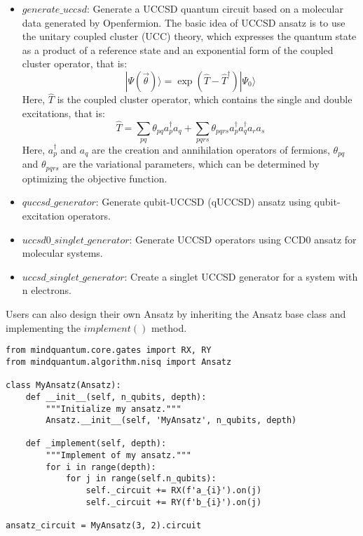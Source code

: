 \begin{itemize}
    \item $generate\_uccsd$: Generate a UCCSD quantum circuit based on a molecular data generated by Openfermion\cite{Peruzzo2014}. The basic idea of UCCSD ansatz is to use the unitary coupled cluster (UCC) theory, which expresses the quantum state as a product of a reference state and an exponential form of the coupled cluster operator, that is:
    $$
    |\Psi(\vec{\theta})\rangle = \exp(\hat{T} - \hat{T}^\dagger)|\Psi_0\rangle
    $$
    Here, $\hat{T}$ is the coupled cluster operator, which contains the single and double excitations, that is:
    $$
    \hat{T} = \sum_{pq}\theta_{pq}a_p^\dagger a_q + \sum_{pqrs}\theta_{pqrs}a_p^\dagger a_q^\dagger a_r a_s
    $$
    Here, $a_p^\dagger$ and $a_q$ are the creation and annihilation operators of fermions, $\theta_{pq}$ and $\theta_{pqrs}$ are the variational parameters, which can be determined by optimizing the objective function.

    \item $quccsd\_generator$: Generate qubit-UCCSD (qUCCSD) ansatz using qubit-excitation operators.
    \item $uccsd0\_singlet\_generator$: Generate UCCSD operators using CCD0 ansatz for molecular systems.
    \item $uccsd\_singlet\_generator$: Create a singlet UCCSD generator for a system with n electrons.
\end{itemize}

Users can also design their own Ansatz by inheriting the Ansatz base class and implementing the $implement()$ method.

\begin{lstlisting}
from mindquantum.core.gates import RX, RY
from mindquantum.algorithm.nisq import Ansatz

class MyAnsatz(Ansatz):
    def __init__(self, n_qubits, depth):
        """Initialize my ansatz."""
        Ansatz.__init__(self, 'MyAnsatz', n_qubits, depth)

    def _implement(self, depth):
        """Implement of my ansatz."""
        for i in range(depth):
            for j in range(self.n_qubits):
                self._circuit += RX(f'a_{i}').on(j)
                self._circuit += RY(f'b_{i}').on(j)

ansatz_circuit = MyAnsatz(3, 2).circuit
\end{lstlisting}